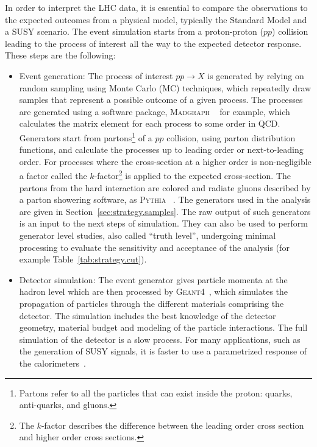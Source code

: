 In order to interpret the LHC data, it is essential to compare the observations to the expected outcomes from a physical model, typically the Standard Model and a SUSY scenario.
The event simulation starts from a proton-proton ($pp$) collision leading to the process of interest all the way to the expected detector response. 
These steps are the following:

\begin{itemize} 
\item Event generation: The process of interest $pp \to X$ is generated by relying on random sampling using Monte Carlo (MC) techniques, which repeatedly draw samples that represent 
  a possible outcome of a given process. The processes are generated using a software package, \textsc{Madgraph} ~\cite{Alwall:2014hca} for example, which calculates the matrix element 
  for each process to some order in QCD. Generators start from partons\footnote{Partons refer to all the particles that can exist inside 
the proton: quarks, anti-quarks, and gluons.} of a $pp$ collision, using parton distribution functions, and calculate the processes up to leading order or next-to-leading order. 
  For processes where the cross-section at a higher order is non-negligible a factor called the $k$-factor\footnote{The $k$-factor 
    describes the difference between the leading order cross section and higher order cross sections.} 
  is applied to the expected cross-section. 
  The partons from the hard interaction are colored and radiate gluons described by a parton showering software, as \textsc{Pythia} ~\cite{Sjostrand:2007gs}. The generators used in the analysis 
  are given in Section~\ref{sec:strategy.samples}. 
  The raw output of such generators 
  is an input to the next steps of simulation. They can also be used to perform generator level studies, also called ``truth level'', undergoing minimal processing to evaluate the 
  sensitivity and  acceptance of the analysis (for example Table~\ref{tab:strategy.cut}).
\item Detector simulation: The event generator gives particle momenta at the hadron level which are then processed by \textsc{Geant4}~\cite{Agostinelli:2002hh}, which simulates
  the propagation of particles through the different materials comprising the detector. The simulation includes  the best knowledge of the detector 
geometry, material budget and modeling of the particle interactions.
The full simulation of the detector is a slow process. For many applications, such as the generation 
  of SUSY signals, it is faster to use a parametrized response of the calorimeters~\cite{ATL-PHYS-PUB-2010-013}.

\end{itemize}
